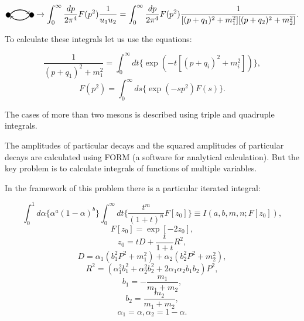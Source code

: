 \documentclass[%
]{ittmm}
\begin{document}
\begin{equation}
        \tikz[baseline=-0.5ex]{
        \filldraw (0, 0) circle (0.1cm);
        \filldraw (1, 0) circle (0.1cm);
        \draw[->, thick] (0.1, 0.05) to[out=45, in=135] (0.9, 0.05);
        \draw[<-, thick] (0.1, -0.05) to[out=-45, in=-135] (0.9, -0.05);
    } \to \int_{0}^{\infty}\frac{dp}{2\pi^4}F(p^2)\frac{1}{u_1u_2} = \int_{0}^{\infty}\frac{dp}{2\pi^4}F(p^2)\frac{1}{[(p + q_1)^2 + m_1^2][(p + q_2)^2 + m_2^2]}.
\end{equation}

To calculate these integrals let us use the equations:

\begin{equation}
    \frac{1}{(p + q_1)^2 + m_1^2} = \int_{0}^{\infty}dt\{\exp(-t[(p + q_i)^2 + m_i^2])\}, 
\end{equation}
\begin{equation}
    F(p^2) = \int_{0}^{\infty}ds\{\exp(-sp^2)F(s)\} .
\end{equation}

The cases of more than two mesons is described using triple and quadruple integrals.

The amplitudes of particular decays and the squared amplitudes of particular decays are calculated using FORM (a software for analytical calculation). But the key problem is to calculate integrals of functions of multiple variables.

In the framework of this problem there is a particular iterated integral:

\begin{equation}
    \label{eq:the-integral}
    \int_{0}^{1}d\alpha\{\alpha^{a}(1 - \alpha)^b\}\int_{0}^{\infty}dt\{\frac{t^m}{(1+t)^n}F[z_{0}]\} \equiv I(a, b, m, n; F[z_{0}]),
\end{equation}
\begin{equation}   
    F[z_0] = \exp[-2z_0],
\end{equation}
\begin{equation} 
    z_0 = tD + \frac{t}{1 + t}R^2,
\end{equation}
\begin{equation}     
    D = \alpha_1(b_1^{2}P^2 + m_1^2) + \alpha_2(b_2^{2}P^2 + m_2^2),
\end{equation}
\begin{equation} 
        R^2 = (\alpha_1^{2}b_1^2 + \alpha_2^{2}b_2^2 + 2\alpha_{1}\alpha_{2}b_{1}b_2)P^2,
\end{equation}
\begin{equation} 
    b_1 = -\frac{m_1}{m_1 + m_2},
\end{equation}
\begin{equation} 
    b_2 = \frac{m_2}{m_1 + m_2},
\end{equation}
\begin{equation}
    \alpha_1 = \alpha, \alpha_2 = 1 - \alpha.
\end{equation}
\end{document}
